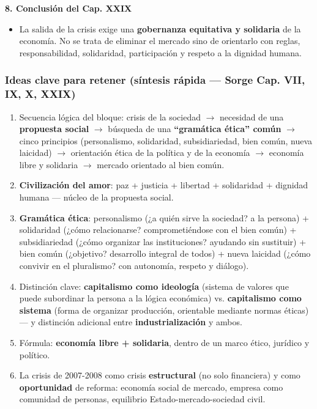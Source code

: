 \documentclass[10pt,a4paper]{article}
\begin{document}
\medskip\noindent \textbf{8. Conclusión del Cap. XXIX}\par\nopagebreak
\begin{itemize}
\item La salida de la crisis exige una \textbf{gobernanza equitativa y solidaria} de la economía. No se trata de eliminar el mercado sino de orientarlo con reglas, responsabilidad, solidaridad, participación y respeto a la dignidad humana.
\end{itemize}

\subsubsection{Ideas clave para retener (síntesis rápida --- Sorge Cap. VII, IX, X, XXIX)}
\begin{enumerate}
\item Secuencia lógica del bloque: crisis de la sociedad $\rightarrow$ necesidad de una \textbf{propuesta social} $\rightarrow$ búsqueda de una \textbf{``gramática ética'' común} $\rightarrow$ cinco principios (personalismo, solidaridad, subsidiariedad, bien común, nueva laicidad) $\rightarrow$ orientación ética de la política y de la economía $\rightarrow$ economía libre y solidaria $\rightarrow$ mercado orientado al bien común.
\item \textbf{Civilización del amor}: paz + justicia + libertad + solidaridad + dignidad humana --- núcleo de la propuesta social.
\item \textbf{Gramática ética}: personalismo (¿a quién sirve la sociedad? a la persona) + solidaridad (¿cómo relacionarse? comprometiéndose con el bien común) + subsidiariedad (¿cómo organizar las instituciones? ayudando sin sustituir) + bien común (¿objetivo? desarrollo integral de todos) + nueva laicidad (¿cómo convivir en el pluralismo? con autonomía, respeto y diálogo).
\item Distinción clave: \textbf{capitalismo como ideología} (sistema de valores que puede subordinar la persona a la lógica económica) vs. \textbf{capitalismo como sistema} (forma de organizar producción, orientable mediante normas éticas) --- y distinción adicional entre \textbf{industrialización} y ambos.
\item Fórmula: \textbf{economía libre + solidaria}, dentro de un marco ético, jurídico y político.
\item La crisis de 2007-2008 como crisis \textbf{estructural} (no solo financiera) y como \textbf{oportunidad} de reforma: economía social de mercado, empresa como comunidad de personas, equilibrio Estado-mercado-sociedad civil.
\end{enumerate}
\end{document}
